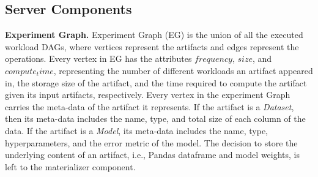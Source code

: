 %

\subsection{Server Components}
\textbf{Experiment Graph.}
Experiment Graph (EG) is the union of all the executed workload DAGs, where vertices represent the artifacts and edges represent the operations.
Every vertex in EG has the attributes $frequency$, $size$, and $compute_time$, representing the number of different workloads an artifact appeared in, the storage size of the artifact, and the time required to compute the artifact given its input artifacts, respectively.
Every vertex in the experiment Graph carries the meta-data of the artifact it represents.
If the artifact is a \textit{Dataset}, then its meta-data includes the name, type, and total size of each column of the data.
If the artifact is a \textit{Model}, its meta-data includes the name, type, hyperparameters, and the error metric of the model.
The decision to store the underlying content of an artifact, i.e., Pandas dataframe and model weights, is left to the materializer component.

